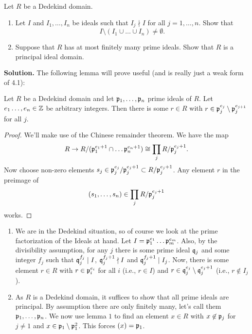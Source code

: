 \documentclass[a4paper,11pt]{article}
\begin{document}
Let $R$ be a Dedekind domain.
\begin{enumerate}
    \item Let $I$ and $I_1, \dots, I_n$ be ideals such that 
        $I_j \nmid I$ for all $j = 1, \dots, n$. Show that 
        \begin{equation*}
            I\setminus(I_1 \cup \dots \cup I_n) \neq \emptyset.
        \end{equation*}
    \item Suppose that $R$ has at most finitely many prime ideals. 
        Show that $R$ is a principal ideal domain.
\end{enumerate}
\textbf{Solution.}
The following lemma will prove useful (and is really just a weak form of 
4.1):
\begin{lem}\label{lem:1}
    Let $R$ be a Dedekind domain and let $\mathfrak{p}_1, \dots, \mathfrak{p}_n$ prime ideals of $R$.
    Let $e_1 \dots, e_n \in \mathbb{Z}$ be arbitrary integers. Then there is some 
    $r \in R$ with $r \in \mathfrak{p}_j^{e_j}\setminus \mathfrak{p}_j^{e_{j+1}}$ for all $j$. 
\begin{proof}
    We'll make use of the Chinese remainder theorem. We have the map
    \begin{equation*}
        R \to R/(\mathfrak{p}_1^{e_1+1} \cap \dots \mathfrak{p}_n^{e_n+1}) \cong
        \prod_j R/\mathfrak{p}_j^{e_j+1}.
    \end{equation*}
    Now choose non-zero elements $s_j \in \mathfrak{p}_j^{e_j}/\mathfrak{p}_j^{e_j+1} \subset
    R/\mathfrak{p}_j^{e_j+1}$. Any element $r$ in the preimage of 
    \begin{equation*}
        (s_1, \dots, s_n) \in \prod_j R/\mathfrak{p}_j^{e_j+1}
    \end{equation*}
    works.
\end{proof}
\end{lem}
\begin{enumerate}
    \item We are in the Dedekind situation, so of course we look at the prime
        factorization of the Ideals at hand. Let 
        $I = \mathfrak{p}_1^{e_1} \dots \mathfrak{p}_m^{e_m}$. Also, by the divisibility
        assumption, for any $j$ there is some prime ideal $\mathfrak{q}_j$ and some integer $f_j$ 
        such that $\mathfrak{q}_j^{f_j} \mid I$, $\mathfrak{q}_j^{f_j+1} \nmid I$ and 
        $\mathfrak{q}_j^{f_j+1} \mid I_j$. Now, there is some element 
        $r \in R$ with $r \in \mathfrak{p}_i^{e_i}$ for all $i$ (i.e., $r \in I$) and 
        $r \in \mathfrak{q}_j^{e_j}\setminus\mathfrak{q}_j^{e_j+1}$
        (i.e., $r \not \in I_j$).

    \item As $R$ is a Dedekind domain, it suffices to show that all
        prime ideals are principal. By assumption there are only finitely many,
        let's call them $\mathfrak{p}_1, \dots, \mathfrak{p}_n$. We now use lemma $1$ to find an
        element $x \in R$ with $x \not \in \mathfrak{p}_j$ for $j \neq 1$ and 
        $x \in \mathfrak{p}_1 \setminus\mathfrak{p}_1^2$. This forces $(x) = \mathfrak{p}_1$. 
\end{enumerate}

\contactend
\end{document}
